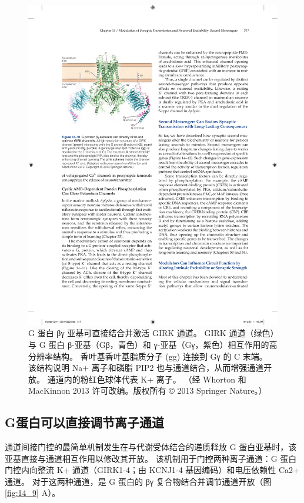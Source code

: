 \begin{figure}[htbp]
	\centering
	\includegraphics[width=0.5\linewidth]{chap14/fig_14_10}
	\caption{G 蛋白 βγ 亚基可直接结合并激活 GIRK 通道。 GIRK 通道（绿色）与 G 蛋白 β-亚基（Gβ，青色）和 γ-亚基（Gγ，紫色）相互作用的高分辨率结构。 香叶基香叶基脂质分子 (gg) 连接到 Gγ 的 C 末端。 该结构说明 Na+ 离子和磷脂 PIP2 也与通道结合，从而增强通道开放。 通道内的粉红色球体代表 K+ 离子。 （经 Whorton 和 MacKinnon 2013 许可改编。版权所有 © 2013 Springer Nature。）}
	\label{fig:14_10}
\end{figure}



\subsection{G蛋白可以直接调节离子通道}
通道间接门控的最简单机制发生在与代谢受体结合的递质释放 G 蛋白亚基时，该亚基直接与通道相互作用以修改其开放。 
该机制用于门控两种离子通道：G 蛋白门控内向整流 K+ 通道（GIRK1-4；由 KCNJ1-4 基因编码）和电压依赖性 Ca2+ 通道。 
对于这两种通道，是 G 蛋白的 βγ 复合物结合并调节通道开放（图 \ref{fig:14_9} A）。

